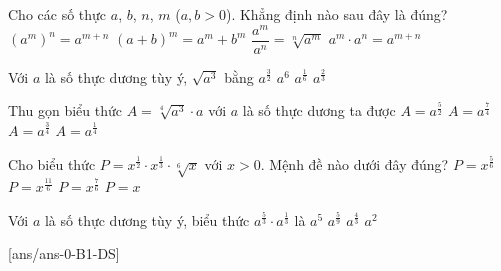 \begin{ex}%
	Cho các số thực $a$, $b$, $n$, $m$ ($a,b>0$). Khẳng định nào sau đây là đúng?
	\choice
	{$\left( a^m\right)^n=a^{m+n} $}
	{$(a+b)^m=a^m+b^m$}
	{$\dfrac{a^m}{a^n}=\sqrt[n]{a^m}$}
	{\True $a^m\cdot a^n=a^{m+n}$}
	
\end{ex}


\begin{ex}%
	Với $a$ là số thực dương tùy ý, $\sqrt{a^3}$ bằng
	\choice
	{\True $a^{\tfrac{3}{2}}$}
	{$a^6$}
	{$a^{\tfrac{1}{6}}$}
	{$a^{\tfrac{2}{3}}$}
\end{ex}
\begin{ex}%
	Thu gọn biểu thức $A=\sqrt[4]{a^3} \cdot a$ với $a$ là số thực dương ta được
	\choice
	{$A=a^{\tfrac{5}{2}}$}
	{\True $A=a^{\tfrac{7}{4}}$}
	{$A=a^{\tfrac{3}{4}}$}
	{$A=a^{\tfrac{1}{4}}$}
	
\end{ex}


\begin{ex}%
	Cho biểu thức $P=x^{\tfrac{1}{2}} \cdot x^{\tfrac{1}{3}} \cdot \sqrt[6]{x}$ với $x > 0$. Mệnh đề nào dưới đây đúng?
	\choice
	{$P=x^{\tfrac{5}{6}}$}
	{$P=x^{\tfrac{11}{6}}$}
	{$P=x^{\tfrac{7}{6}}$}
	{\True $P=x$}
\end{ex}



\begin{ex}%
	Với $a$ là số thực dương tùy ý, biểu thức $a^{\tfrac{5}{3}}\cdot a^{\tfrac{1}{3}}$ là
	\choice
	{$a^{5}$}
	{$a^{\tfrac{5}{9}}$}
	{$a^{\tfrac{4}{3}}$}
	{\True $a^2$}
\end{ex}
\cauds
{}[ans/ans-0-B1-DS]

